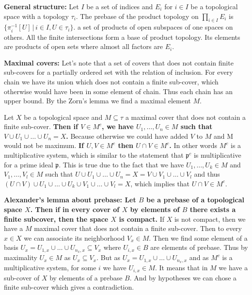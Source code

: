 \documentclass{article}
\begin{document}
\textbf{General structure:} Let $I$ be a set of indices and $E_i$ for $i\in I$
be a topological space with a topology $\tau_i$. The prebase of the product
topology on  $\prod_{i\in I} E_i$ is $\{\pi_i^{-1}[U]\,|\,i\in I,U\in\tau_i\}$.
a set of products of open subspaces of one spaces on others. All the finite
intersections form a base of product topology. Its elements are products of
open sets where almost all factors are $E_i$.
\vspace{1ex}

\textbf{Maximal covers:} Let's note that a set of covers that does not contain
finite sub-covers for a partially ordered set with the relation of inclusion.
For every chain we have its union which does not contain a finite sub-cover,
which otherwise would have been in some element of chain. Thus each chain has an
upper bound. By the Zorn's lemma we find a maximal element $M$.
\vspace{1ex}

Let $X$ be a topological space and $M\subseteq\tau$ a maximal cover that does
not contain a finite sub-cover. \textbf{Then if $V\in M^c$, we have $U_1,\ldots,
U_n\in M$ such that $V\cup U_1\cup\ldots\cup U_n=X$.} Because otherwise we
could have added $V$ to $M$ and M would not be maximum. \textbf{If
$U,V\in M^c$ then $U\cap V\in M^c$.} In other words $M^c$ is a multiplicative
system, which is similar to the statement that $\mathfrak{p}^c$ is multiplicative
for a prime ideal $\mathfrak{p}$. This is true due to the fact that we have
$U_1,\ldots,U_k\in M$ and $V_1,\ldots,V_l\in M$ such that $U\cup U_1\cup\ldots
\cup U_n = X = V\cup V_1\cup\ldots\cup V_l$ and thus $(U\cap V)\cup U_1\cup\ldots
\cup U_k\cup V_1\cup\ldots\cup V_l=X$, which implies that $U\cap V\in M^c$.
\vspace{1ex}

\textbf{Alexander's lemma about prebase: Let $B$ be a prebase of a topological
space $X$. Then if in every cover of $X$ by elements of $B$ there exists a finite
subcover, then the space $X$ is compact.} If $X$ is not compact, then we have
a $M$ maximal cover that does not contain a finite sub-cover. Then to every
$x\in X$ we can associate its neighborhood $V_x\in M$. Then we find some
element of a basis $U_x=U_{1,x}\cup\ldots\cup U_{n_x,x}\subseteq V_x$ where
$U_{i,x}\in B$ are elements of prebase. Thus by maximality $U_x\in M$ as
$U_x\subseteq V_x$. But as $U_x=U_{1,x}\cup\ldots\cup U_{n_x,x}$ and as $M^c$
is a multiplicative system, for some $i$ we have $U_{i,x}\in M$. It means that
in $M$ we have a sub-cover of $X$ by elements of a prebase $B$. And by hypotheses
we can chose a finite sub-cover which gives a contradiction.
\vspace{1ex}
\end{document}
